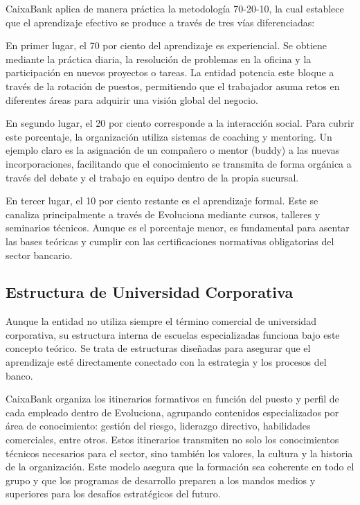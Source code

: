 CaixaBank aplica de manera práctica la metodología 70-20-10, la cual establece que el aprendizaje efectivo se produce a través de tres vías diferenciadas:

En primer lugar, el 70 por ciento del aprendizaje es experiencial. Se obtiene mediante la práctica diaria, la resolución de problemas en la oficina y la participación en nuevos proyectos o tareas. La entidad potencia este bloque a través de la rotación de puestos, permitiendo que el trabajador asuma retos en diferentes áreas para adquirir una visión global del negocio.

En segundo lugar, el 20 por ciento corresponde a la interacción social. Para cubrir este porcentaje, la organización utiliza sistemas de coaching y mentoring. Un ejemplo claro es la asignación de un compañero o mentor (buddy) a las nuevas incorporaciones, facilitando que el conocimiento se transmita de forma orgánica a través del debate y el trabajo en equipo dentro de la propia sucursal.

En tercer lugar, el 10 por ciento restante es el aprendizaje formal. Este se canaliza principalmente a través de Evoluciona mediante cursos, talleres y seminarios técnicos. Aunque es el porcentaje menor, es fundamental para asentar las bases teóricas y cumplir con las certificaciones normativas obligatorias del sector bancario.

\subsection{Estructura de Universidad Corporativa}

Aunque la entidad no utiliza siempre el término comercial de universidad corporativa, su estructura interna de escuelas especializadas funciona bajo este concepto teórico. Se trata de estructuras diseñadas para asegurar que el aprendizaje esté directamente conectado con la estrategia y los procesos del banco.

CaixaBank organiza los itinerarios formativos en función del puesto y perfil de cada empleado dentro de Evoluciona, agrupando contenidos especializados por área de conocimiento: gestión del riesgo, liderazgo directivo, habilidades comerciales, entre otros. Estos itinerarios transmiten no solo los conocimientos técnicos necesarios para el sector, sino también los valores, la cultura y la historia de la organización. Este modelo asegura que la formación sea coherente en todo el grupo y que los programas de desarrollo preparen a los mandos medios y superiores para los desafíos estratégicos del futuro.

